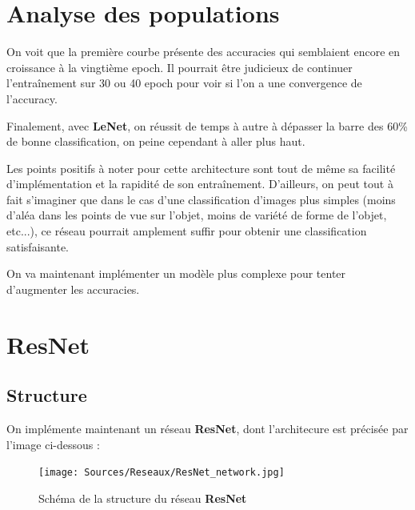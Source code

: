 \documentclass{report}
\begin{document}
\section{Analyse des populations}







On voit que la première courbe présente des accuracies qui semblaient encore en croissance à la vingtième 
epoch. Il pourrait être judicieux de continuer l'entraînement sur 30 ou 40 epoch pour voir si l'on a une 
convergence de l'accuracy.

\vspace{0.3cm}

Finalement, avec \textbf{LeNet}, on réussit de temps à autre à dépasser la barre des 60\% de bonne classification, 
on peine cependant à aller plus haut.

\vspace{0.3cm}

Les points positifs à noter pour cette architecture sont tout de même sa facilité d'implémentation et la 
rapidité de son entraînement. D'ailleurs, on peut tout à fait s'imaginer que dans le cas d'une classification 
d'images plus simples (moins d'aléa dans les points de vue sur l'objet, moins de variété de forme de l'objet, 
etc...), ce réseau pourrait amplement suffir pour obtenir une classification satisfaisante.

\vspace{0.3cm}

On va maintenant implémenter un modèle plus complexe pour tenter d'augmenter les accuracies.


\newpage

\section{ResNet}

\subsection{Structure}

On implémente maintenant un réseau \textbf{ResNet}, dont l'architecure est précisée par l'image ci-dessous : 

\begin{figure}[ht]
    \centering
    \texttt{[image: Sources/Reseaux/ResNet\_network.jpg]}
    \caption{Schéma de la structure du réseau \textbf{ResNet}}
    \label{fig:schema_ResNet}
\end{figure}
\end{document}
